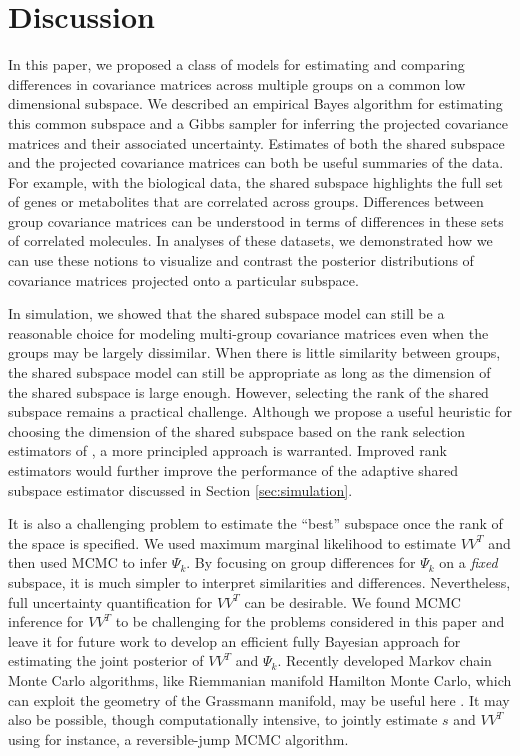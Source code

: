 \documentclass[12pt]{article}
\begin{document}
\section{Discussion}

In this paper, we proposed a class of models for estimating and
comparing differences in covariance matrices across multiple groups on
a common low dimensional subspace.  We described an empirical Bayes
algorithm for estimating this common subspace and a Gibbs sampler for
inferring the projected covariance matrices and their associated
uncertainty.  Estimates of both the shared subspace and the projected
covariance matrices can both be useful summaries of the data.  For
example, with the biological data, the shared subspace highlights the
full set of genes or metabolites that are correlated across groups.
Differences between group covariance matrices can be understood in
terms of differences in these sets of correlated molecules.  In
analyses of these datasets, we demonstrated how
we can use these notions to visualize and contrast the posterior
distributions of covariance matrices projected onto a particular
subspace.

In simulation, we showed that the shared subspace model can still be a
reasonable choice for modeling multi-group covariance matrices even
when the groups may be largely dissimilar.  When there is little
similarity between groups, the shared subspace model can still be appropriate as
long as the dimension of the shared subspace is large enough.
However, selecting the rank of the shared subspace remains a practical
challenge.  Although we propose a useful heuristic for choosing the
dimension of the shared subspace based on the rank selection
estimators of \citet{Gavish2014}, a more principled approach is
warranted.  Improved rank estimators would further improve the
performance of the adaptive shared subspace estimator discussed in
Section \ref{sec:simulation}.

It is also a challenging problem to estimate the ``best'' subspace
once the rank of the space is specified.  We used maximum marginal
likelihood to estimate $VV^T$ and then used MCMC to
infer $\Psi_k$.  By focusing on group differences for $\Psi_k$ on a
\emph{fixed} subspace, it is much simpler to interpret similarities
and differences.  Nevertheless, full uncertainty quantification for
$VV^T$ can be desirable.  We found MCMC inference for $VV^T$ to be
challenging for the problems considered in this paper and leave it for
future work to develop an efficient fully Bayesian approach for
estimating the joint posterior of $VV^T$ and $\Psi_k$.  Recently
developed Markov chain Monte Carlo algorithms, like Riemmanian
manifold Hamilton Monte Carlo, which can exploit the geometry of the
Grassmann manifold, may be useful here \citep{Byrne2013,
  Girolami2011}.  It may also be possible, though computationally
intensive, to jointly estimate $s$ and $VV^T$ using for instance,
a reversible-jump MCMC algorithm.
\end{document}
